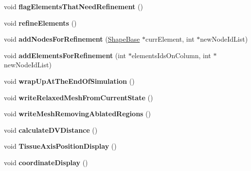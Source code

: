 \begin{DoxyCompactItemize}
\item 
\hypertarget{classSimulation_a0721e395d217098547e6205e84b5d6cb}{}void {\bfseries flag\+Elements\+That\+Need\+Refinement} ()\label{classSimulation_a0721e395d217098547e6205e84b5d6cb}

\item 
\hypertarget{classSimulation_a2247f9f97dfaed7f8af8be0f3fc3a4d4}{}void {\bfseries refine\+Elements} ()\label{classSimulation_a2247f9f97dfaed7f8af8be0f3fc3a4d4}

\item 
\hypertarget{classSimulation_a0963e96f4060f200dbd696e156dc2f0b}{}void {\bfseries add\+Nodes\+For\+Refinement} (\hyperlink{classShapeBase}{Shape\+Base} $\ast$curr\+Element, int $\ast$new\+Node\+Id\+List)\label{classSimulation_a0963e96f4060f200dbd696e156dc2f0b}

\item 
\hypertarget{classSimulation_a1c2a4fb3665f5a422b986d0bc6a131a2}{}void {\bfseries add\+Elements\+For\+Refinement} (int $\ast$elements\+Ids\+On\+Column, int $\ast$new\+Node\+Id\+List)\label{classSimulation_a1c2a4fb3665f5a422b986d0bc6a131a2}

\item 
\hypertarget{classSimulation_ada1776f97a899b0e77e20df658713cb3}{}void {\bfseries wrap\+Up\+At\+The\+End\+Of\+Simulation} ()\label{classSimulation_ada1776f97a899b0e77e20df658713cb3}

\item 
\hypertarget{classSimulation_ac6cb6f4e1f7060527ead71c2ce83727d}{}void {\bfseries write\+Relaxed\+Mesh\+From\+Current\+State} ()\label{classSimulation_ac6cb6f4e1f7060527ead71c2ce83727d}

\item 
\hypertarget{classSimulation_a1e990cd49b78fbe08f5e594c71872ac4}{}void {\bfseries write\+Mesh\+Removing\+Ablated\+Regions} ()\label{classSimulation_a1e990cd49b78fbe08f5e594c71872ac4}

\item 
\hypertarget{classSimulation_a2cdf77d01390a32cabb8ba7535a9f7dd}{}void {\bfseries calculate\+D\+V\+Distance} ()\label{classSimulation_a2cdf77d01390a32cabb8ba7535a9f7dd}

\item 
\hypertarget{classSimulation_abb87948e7b8131fd5d747bf728232db2}{}void {\bfseries Tissue\+Axis\+Position\+Display} ()\label{classSimulation_abb87948e7b8131fd5d747bf728232db2}

\item 
\hypertarget{classSimulation_a1d49a9ab3e83456d86ec5bfcf0d1a804}{}void {\bfseries coordinate\+Display} ()\label{classSimulation_a1d49a9ab3e83456d86ec5bfcf0d1a804}


\end{DoxyCompactItemize}
